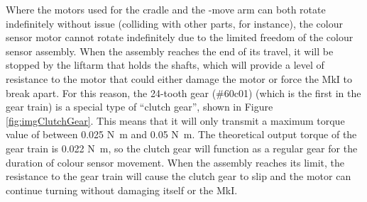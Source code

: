 \documentclass{report}
\newcommand{\legopiece}[1]{(\##1)}
\newcommand{\move}[1]{\uppercase{\texttt{\formatmovesnospace{#1}}}-move}
\begin{document}
	Where the motors used for the cradle and the \move{x} arm can both rotate indefinitely without issue (colliding with other parts, for instance), the colour sensor motor cannot rotate indefinitely due to the limited freedom of the colour sensor assembly. When the assembly reaches the end of its travel, it will be stopped by the liftarm that holds the shafts, which will provide a level of resistance to the motor that could either damage the motor or force the MkI to break apart. For this reason, the 24-tooth gear \legopiece{60c01} (which is the first in the gear train) is a special type of \enquote{clutch gear}, shown in Figure \ref{fig:imgClutchGear}. This means that it will only transmit a maximum torque value of between 0.025 \si{\newton\metre} and 0.05 \si{\newton\metre}. The theoretical output torque of the gear train is 0.022 \si{\newton\metre}, so the clutch gear will function as a regular gear for the duration of colour sensor movement. When the assembly reaches its limit, the resistance to the gear train will cause the clutch gear to slip and the motor can continue turning without damaging itself or the MkI. 
	
\end{document}
